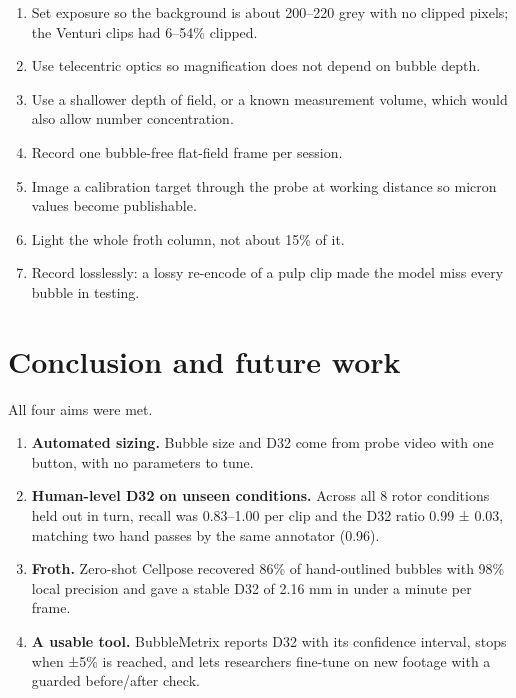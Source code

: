 \begin{enumerate}
\def\labelenumi{\arabic{enumi}.}
\tightlist
\item
  Set exposure so the background is about 200--220 grey with no clipped
  pixels; the Venturi clips had 6--54\% clipped.
\item
  Use telecentric optics so magnification does not depend on bubble
  depth.
\item
  Use a shallower depth of field, or a known measurement volume, which
  would also allow number concentration.
\item
  Record one bubble-free flat-field frame per session.
\item
  Image a calibration target through the probe at working distance so
  micron values become publishable.
\item
  Light the whole froth column, not about 15\% of it.
\item
  Record losslessly: a lossy re-encode of a pulp clip made the model
  miss every bubble in testing.
\end{enumerate}

\hypertarget{conclusion-and-future-work}{%
\section{Conclusion and future work}\label{conclusion-and-future-work}}

All four aims were met.

\begin{enumerate}
\def\labelenumi{\arabic{enumi}.}
\tightlist
\item
  \textbf{Automated sizing.} Bubble size and D32 come from probe video
  with one button, with no parameters to tune.
\item
  \textbf{Human-level D32 on unseen conditions.} Across all 8 rotor
  conditions held out in turn, recall was 0.83--1.00 per clip and the
  D32 ratio 0.99 ± 0.03, matching two hand passes by the same annotator
  (0.96).
\item
  \textbf{Froth.} Zero-shot Cellpose recovered 86\% of hand-outlined
  bubbles with 98\% local precision and gave a stable D32 of 2.16 mm in
  under a minute per frame.
\item
  \textbf{A usable tool.} BubbleMetrix reports D32 with its confidence
  interval, stops when ±5\% is reached, and lets researchers fine-tune
  on new footage with a guarded before/after check.
\end{enumerate}

